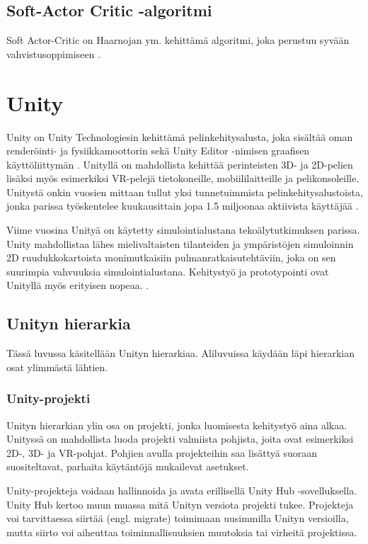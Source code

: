 \documentclass[utf8]{gradu3}
\begin{document}
\section{Soft-Actor Critic -algoritmi}

Soft Actor-Critic on Haarnojan ym. kehittämä algoritmi, joka perustuu syvään vahvistusoppimiseen \parencite{haarnoja2018soft}. 

\chapter{Unity}

Unity on Unity Technologiesin kehittämä pelinkehitysalusta, joka sisältää oman renderöinti- ja fysiikkamoottorin sekä Unity Editor -nimisen graafisen käyttöliittymän \parencite{juliani2018unity}. Unityllä on mahdollista kehittää perinteisten 3D- ja 2D-pelien lisäksi myös esimerkiksi VR-pelejä tietokoneille, mobiililaitteille ja pelikonsoleille. Unitystä onkin vuosien mittaan tullut yksi tunnetuimmista pelinkehitysalustoista, jonka parissa työskentelee kuukausittain jopa 1.5 miljoonaa aktiivista käyttäjää \parencite{unityweb}.

Viime vuosina Unityä on käytetty simulointialustana tekoälytutkimuksen parissa. Unity mahdollistaa lähes mielivaltaisten tilanteiden ja ympäristöjen simuloinnin 2D ruudukkokartoista monimutkaisiin pulmanratkaisutehtäviin, joka on sen suurimpia vahvuuksia simulointialustana. Kehitystyö ja prototypointi ovat Unityllä myös erityisen nopeaa. \parencite{juliani2018unity}.

\section{Unityn hierarkia}

Tässä luvussa käsitellään Unityn hierarkiaa. Aliluvuissa käydään läpi hierarkian osat ylimmästä lähtien.

\subsection{Unity-projekti}

Unityn hierarkian ylin osa on projekti, jonka luomisesta kehitystyö aina alkaa. Unityssä on mahdollista luoda projekti valmiista pohjista, joita ovat esimerkiksi 2D-, 3D- ja VR-pohjat. Pohjien avulla projekteihin saa lisättyä suoraan suositeltavat, parhaita käytäntöjä mukailevat asetukset.

Unity-projekteja voidaan hallinnoida ja avata erillisellä Unity Hub -sovelluksella. Unity Hub kertoo muun muassa mitä Unityn versiota projekti tukee. Projekteja voi tarvittaessa siirtää (engl. migrate) toimimaan uusimmilla Unityn versioilla, mutta siirto voi aiheuttaa toiminnallisuuksien muutoksia tai virheitä projektissa.
\end{document}
